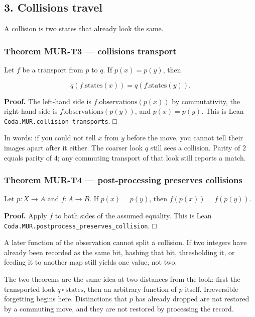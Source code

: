 \documentclass[
  11pt,
]{article}
\begin{document}
\subsection{3. Collisions travel}\label{collisions-travel}

A collision is two states that already look the same.

\subsubsection{Theorem MUR-T3 --- collisions transport}\label{theorem-mur-t3-collisions-transport}

Let \(f\) be a transport from \(p\) to \(q\). If \(p(x)=p(y)\), then

\[
q(f.\mathrm{states}(x))=q(f.\mathrm{states}(y)).
\]

\textbf{Proof.} The left-hand side is \(f.\mathrm{observations}(p(x))\) by commutativity, the right-hand side is \(f.\mathrm{observations}(p(y))\), and \(p(x)=p(y)\). This is Lean \nolinkurl{Coda.MUR.collision_transports}. □

In words: if you could not tell \(x\) from \(y\) before the move, you cannot tell their images apart after it either. The coarser look \(q\) still sees a collision. Parity of \(2\) equals parity of \(4\); any commuting transport of that look still reports a match.

\subsubsection{Theorem MUR-T4 --- post-processing preserves collisions}\label{theorem-mur-t4-post-processing-preserves-collisions}

Let \(p:X\to A\) and \(f:A\to B\). If \(p(x)=p(y)\), then \(f(p(x))=f(p(y))\).

\textbf{Proof.} Apply \(f\) to both sides of the assumed equality. This is Lean \nolinkurl{Coda.MUR.postprocess_preserves_collision}. □

A later function of the observation cannot split a collision. If two integers have already been recorded as the same bit, hashing that bit, thresholding it, or feeding it to another map still yields one value, not two.

The two theorems are the same idea at two distances from the look: first the transported look \(q\circ\mathrm{states}\), then an arbitrary function of \(p\) itself. Irreversible forgetting begins here. Distinctions that \(p\) has already dropped are not restored by a commuting move, and they are not restored by processing the record.
\end{document}
